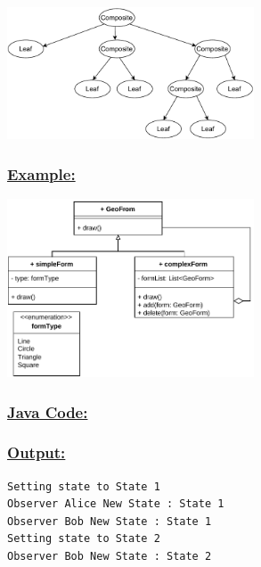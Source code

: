 \vspace{0.25cm}
\begin{center}
\includegraphics[width=0.55\textwidth,height=0.4\textheight]{Chapters/DesignPattern/Composite/tree.drawio.pdf}
\end{center}



\vspace{0.25cm}
\subsubsection*{\underline{Example:}}
\begin{center}
\includegraphics[width=0.55\textwidth,height=0.4\textheight]{Chapters/DesignPattern/Composite/comp2.drawio.pdf}
\end{center}

\newpage
\subsubsection*{\underline{Java Code:}}



\newpage

\newpage


\subsubsection*{\underline{Output:}}
\begin{lstlisting}[style=cmd]
Setting state to State 1
Observer Alice New State : State 1
Observer Bob New State : State 1
Setting state to State 2
Observer Bob New State : State 2
\end{lstlisting}

